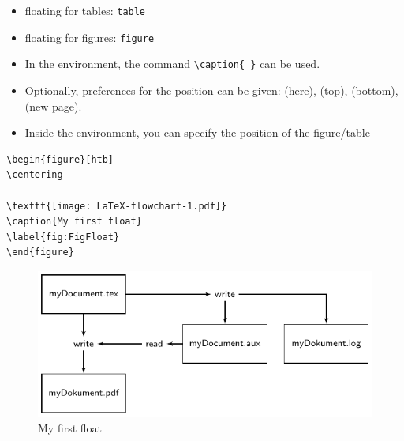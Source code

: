 \begin{frame}[fragile]

\begin{itemize}
	\item floating for tables: \lstinline|table|
	
	\item floating for figures: \lstinline|figure|
	
	\item In the environment, the command \lstinline|\caption{ }| can be used.
	
	\item Optionally, preferences for the position can be given:  (here),  (top),  (bottom),  (new page).
	
	\item Inside the environment, you can specify the position of the figure/table
\end{itemize}	

\begin{multicols}{2}
	
\begin{lstlisting}
\begin{figure}[htb]
\centering

\texttt{[image: LaTeX-flowchart-1.pdf]}
\caption{My first float}
\label{fig:FigFloat}
\end{figure}
\end{lstlisting}

\columnbreak

\begin{figure}[htb]
\includegraphics[scale=0.5]{../../texfiles-beamer/tex-material/WissArb-latex/LaTeX-flowchart-1.pdf}
\caption{My first float}
\label{fig:FigFloat}
\end{figure}
\end{multicols}

\end{frame}


